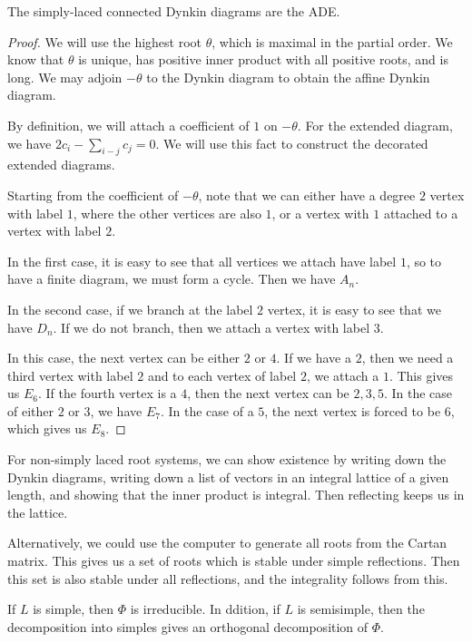 \documentclass[twoside, 10pt]{article}
\begin{document}
    \begin{thm}
        The simply-laced connected Dynkin diagrams are the ADE.
    \end{thm}

    \begin{proof}
        We will use the highest root $\theta$, which is maximal in the partial order. We know that $\theta$ is unique, has positive inner product with all positive roots, and is long. We may adjoin $-\theta$ to the Dynkin diagram to obtain the affine Dynkin diagram.

        By definition, we will attach a coefficient of $1$ on $-\theta$. For the extended diagram, we have $2c_i - \sum_{i-j} c_j = 0$. We will use this fact to construct the decorated extended diagrams.

        Starting from the coefficient of $-\theta$, note that we can either have a degree $2$ vertex with label $1$, where the other vertices are also $1$, or a vertex with $1$ attached to a vertex with label $2$.

        In the first case, it is easy to see that all vertices we attach have label $1$, so to have a finite diagram, we must form a cycle. Then we have $A_n$.

        In the second case, if we branch at the label $2$ vertex, it is easy to see that we have $D_n$. If we do not branch, then we attach a vertex with label $3$.

        In this case, the next vertex can be either $2$ or $4$. If we have a $2$, then we need a third vertex with label $2$ and to each vertex of label $2$, we attach a $1$. This gives us $E_6$. If the fourth vertex is a $4$, then the next vertex can be $2,3,5$. In the case of either $2$ or $3$, we have $E_7$. In the case of a $5$, the next vertex is forced to be $6$, which gives us $E_8$.
    \end{proof}

    For non-simply laced root systems, we can show existence by writing down the Dynkin diagrams, writing down a list of vectors in an integral lattice of a given length, and showing that the inner product is integral. Then reflecting keeps us in the lattice.

    Alternatively, we could use the computer to generate all roots from the Cartan matrix. This gives us a set of roots which is stable under simple reflections. Then this set is also stable under all reflections, and the integrality follows from this.

    \begin{prop}
        If $L$ is simple, then $\Phi$ is irreducible. In ddition, if $L$ is semisimple, then the decomposition into simples gives an orthogonal decomposition of $\Phi$.
    \end{prop}
\end{document}

